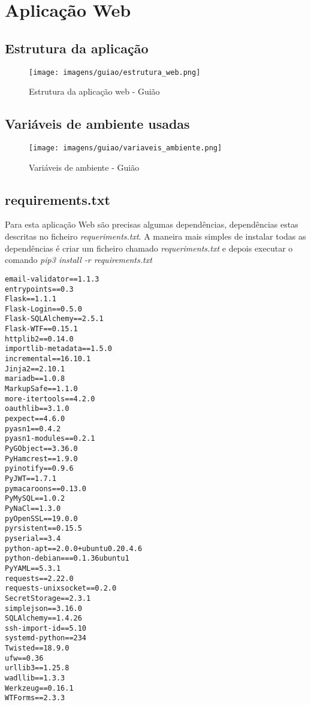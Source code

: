 \documentclass{report}
\begin{document}
\section{Aplicação Web}
\subsection{Estrutura da aplicação}

\begin{figure}[H]
\center
\texttt{[image: imagens/guiao/estrutura\_web.png]}
\caption{Estrutura da aplicação web - Guião}
\label{fig.nav}
\end{figure}

\clearpage

\subsection{Variáveis de ambiente usadas}

\begin{figure}[H]
\center
\texttt{[image: imagens/guiao/variaveis\_ambiente.png]}
\caption{Variáveis de ambiente - Guião}
\label{fig.nav}
\end{figure}



\subsection{requirements.txt}
Para esta aplicação Web são precisas algumas dependências, dependências estas descritas no ficheiro \emph{requeriments.txt}. A maneira mais simples de instalar todas as dependências é criar um ficheiro chamado \emph{requeriments.txt} e depois executar o comando \emph{pip3 install -r requirements.txt}

\begin{lstlisting}
email-validator==1.1.3
entrypoints==0.3
Flask==1.1.1
Flask-Login==0.5.0
Flask-SQLAlchemy==2.5.1
Flask-WTF==0.15.1
httplib2==0.14.0
importlib-metadata==1.5.0
incremental==16.10.1
Jinja2==2.10.1
mariadb==1.0.8
MarkupSafe==1.1.0
more-itertools==4.2.0
oauthlib==3.1.0
pexpect==4.6.0
pyasn1==0.4.2
pyasn1-modules==0.2.1
PyGObject==3.36.0
PyHamcrest==1.9.0
pyinotify==0.9.6
PyJWT==1.7.1
pymacaroons==0.13.0
PyMySQL==1.0.2
PyNaCl==1.3.0
pyOpenSSL==19.0.0
pyrsistent==0.15.5
pyserial==3.4
python-apt==2.0.0+ubuntu0.20.4.6
python-debian===0.1.36ubuntu1
PyYAML==5.3.1
requests==2.22.0
requests-unixsocket==0.2.0
SecretStorage==2.3.1
simplejson==3.16.0
SQLAlchemy==1.4.26
ssh-import-id==5.10
systemd-python==234
Twisted==18.9.0
ufw==0.36
urllib3==1.25.8
wadllib==1.3.3
Werkzeug==0.16.1
WTForms==2.3.3
\end{lstlisting}
\end{document}
